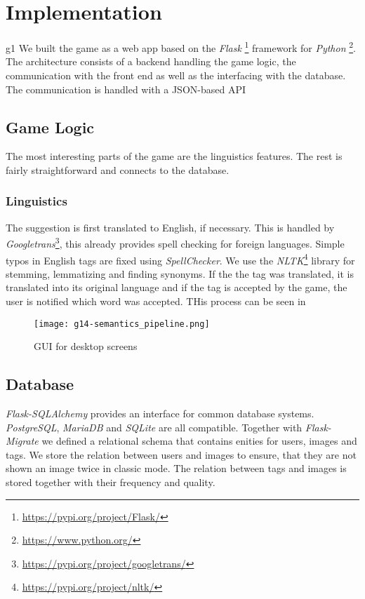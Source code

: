 \section{Implementation}
\label{g14:sec:implementation}

g1
We built the game as a web app based on the \textit{Flask} \footnote{\url{https://pypi.org/project/Flask/}} framework for \textit{Python} \footnote{\url{https://www.python.org/}}. The architecture consists of a backend handling the game logic, the communication with the front end as well as the interfacing with the database. The communication is handled with a JSON-based API

\subsection{Game Logic}
\label{g14:sec:implementation:game}

The most interesting parts of the game are the linguistics features. The rest is fairly straightforward and connects to the database.

\subsubsection{Linguistics}
\label{g14:sec:implementation:linguistics}
The suggestion is first translated to English, if necessary. This is handled by \textit{Googletrans}\footnote{\url{https://pypi.org/project/googletrans/}}, this already provides spell checking for foreign languages.
Simple typos in English tags are fixed using \textit{SpellChecker}. We use the \textit{NLTK}\footnote{\url{https://pypi.org/project/nltk/}} library for stemming, lemmatizing and finding synonyms. If the the tag was translated, it is translated into its original language and if the tag is accepted by the game, the user is notified which word was accepted. THis process can be seen in 

\begin{figure}[tb]
	\centering
	\texttt{[image: g14-semantics\_pipeline.png]}
	\caption{GUI for desktop screens}
	\label{g14:fig:semanticpipeline}
\end{figure}

\subsection{Database}
\label{g14:sec:implementation:database}
\textit{Flask-SQLAlchemy} provides an interface for common database systems. \textit{PostgreSQL}, \textit{MariaDB} and \textit{SQLite} are all compatible.
Together with \textit{Flask-Migrate} we defined a relational schema that contains enities for users, images and tags. We store the relation between users and images to ensure, that they are not shown an image twice in classic mode. The relation between tags and images is stored together with their frequency and quality.

